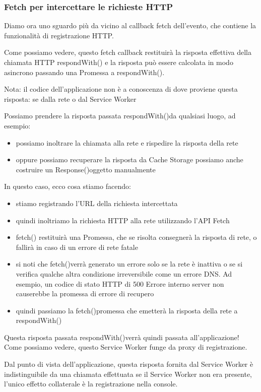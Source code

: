 \documentclass[italian]{article}
\begin{document}
\subsubsection{Fetch per intercettare le richieste HTTP}
Diamo ora uno sguardo più da vicino al callback fetch dell'evento, che contiene la funzionalità di registrazione HTTP.

Come possiamo vedere, questo fetch callback restituirà la risposta effettiva della chiamata HTTP respondWith() e la risposta può essere calcolata in modo asincrono passando una Promessa a respondWith().

Nota: il codice dell'applicazione non è a conoscenza di dove proviene questa risposta: se dalla rete o dal Service Worker

Possiamo prendere la risposta passata respondWith()da qualsiasi luogo, ad esempio:
\begin{itemize}
\item possiamo inoltrare la chiamata alla rete e rispedire la risposta della rete
\item oppure possiamo recuperare la risposta da Cache Storage
possiamo anche costruire un Response()oggetto manualmente
\end{itemize}

In questo caso, ecco cosa stiamo facendo:
\begin{itemize}
\item stiamo registrando l'URL della richiesta intercettata
\item quindi inoltriamo la richiesta HTTP alla rete utilizzando l'API Fetch
\item fetch() restituirà una Promessa, che se risolta consegnerà la risposta di rete, o fallirà in caso di un errore di rete fatale
\item si noti che fetch()verrà generato un errore solo se la rete è inattiva o se si verifica qualche altra condizione irreversibile come un errore DNS. Ad esempio, un codice di stato HTTP di 500 Errore interno server non causerebbe la promessa di errore di recupero
\item quindi passiamo la fetch()promessa che emetterà la risposta della rete a respondWith()
\end{itemize}
Questa risposta passata respondWith()verrà quindi passata all'applicazione! Come possiamo vedere, questo Service Worker funge da proxy di registrazione.

Dal punto di vista dell'applicazione, questa risposta fornita dal Service Worker è indistinguibile da una chiamata effettuata se il Service Worker non era presente, l'unico effetto collaterale è la registrazione nella console.
\end{document}
